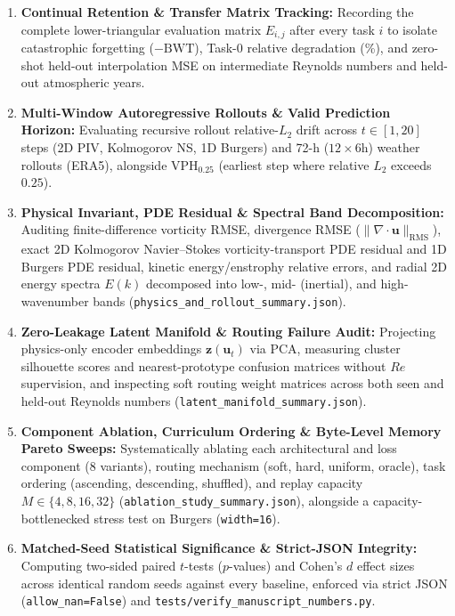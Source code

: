\documentclass[11pt,a4paper]{article}
\begin{document}
\begin{enumerate}
  \item \textbf{Continual Retention \& Transfer Matrix Tracking:} Recording the complete lower-triangular evaluation matrix $E_{i,j}$ after every task $i$ to isolate catastrophic forgetting ($-\text{BWT}$), Task-0 relative degradation (\%), and zero-shot held-out interpolation MSE on intermediate Reynolds numbers and held-out atmospheric years.
  \item \textbf{Multi-Window Autoregressive Rollouts \& Valid Prediction Horizon:} Evaluating recursive rollout relative-$L_2$ drift across $t \in [1, 20]$ steps (2D PIV, Kolmogorov NS, 1D Burgers) and 72-h ($12 \times 6\text{h}$) weather rollouts (ERA5), alongside $\text{VPH}_{0.25}$ (earliest step where relative $L_2$ exceeds $0.25$).
  \item \textbf{Physical Invariant, PDE Residual \& Spectral Band Decomposition:} Auditing finite-difference vorticity RMSE, divergence RMSE ($\|\nabla \cdot \mathbf{u}\|_{\text{RMS}}$), exact 2D Kolmogorov Navier--Stokes vorticity-transport PDE residual and 1D Burgers PDE residual, kinetic energy/enstrophy relative errors, and radial 2D energy spectra $E(k)$ decomposed into low-, mid- (inertial), and high-wavenumber bands (\texttt{physics\_and\_rollout\_summary.json}).
  \item \textbf{Zero-Leakage Latent Manifold \& Routing Failure Audit:} Projecting physics-only encoder embeddings $\mathbf{z}(\mathbf{u}_t)$ via PCA, measuring cluster silhouette scores and nearest-prototype confusion matrices without $Re$ supervision, and inspecting soft routing weight matrices across both seen and held-out Reynolds numbers (\texttt{latent\_manifold\_summary.json}).
  \item \textbf{Component Ablation, Curriculum Ordering \& Byte-Level Memory Pareto Sweeps:} Systematically ablating each architectural and loss component (8 variants), routing mechanism (soft, hard, uniform, oracle), task ordering (ascending, descending, shuffled), and replay capacity $M \in \{4, 8, 16, 32\}$ (\texttt{ablation\_study\_summary.json}), alongside a capacity-bottlenecked stress test on Burgers (\texttt{width=16}).
  \item \textbf{Matched-Seed Statistical Significance \& Strict-JSON Integrity:} Computing two-sided paired $t$-tests ($p$-values) and Cohen's $d$ effect sizes across identical random seeds against every baseline, enforced via strict JSON (\texttt{allow\_nan=False}) and \texttt{tests/verify\_manuscript\_numbers.py}.
\end{enumerate}
\end{document}
